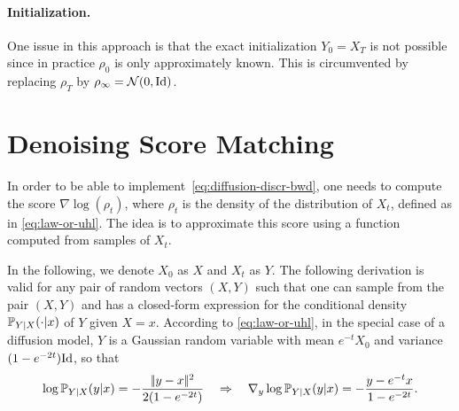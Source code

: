 \paragraph{Initialization.} One issue in this approach is that the exact initialization $Y_0=X_T$ is not possible since in practice $\rho_0$ is only approximately known. This is circumvented by replacing $\rho_T$ by $\rho_\infty = \mathcal{N}(0,\mathrm{Id})$.


\section{Denoising Score Matching}

In order to be able to implement~\eqref{eq:diffusion-discr-bwd}, one needs to compute the score $\nabla \log(\rho_t)$, where $\rho_t$ is the density of the distribution of $X_t$, defined as in \eqref{eq:law-or-uhl}. The idea is to approximate this score using a function computed from samples of $X_t$.

In the following, we denote $X_0$ as $X$ and $X_t$ as $Y$. The following derivation is valid for any pair of random vectors $(X,Y)$ such that one can sample from the pair $(X,Y)$ and has a closed-form expression for the conditional density $\mathbb{P}_{Y|X}(\cdot|x)$ of $Y$ given $X=x$. According to \eqref{eq:law-or-uhl}, in the special case of a diffusion model, $Y$ is a Gaussian random variable with mean $e^{-t} X_0$ and variance $(1-e^{-2t}) \mathrm{Id}$, so that 
\begin{equation}
	\log \mathbb{P}_{Y|X}(y|x) =- \frac{|\!| y-x |\!|^2}{2 (1-e^{-2t})}
	\quad \Rightarrow \quad
	\nabla_y \log \mathbb{P}_{Y|X}(y|x) = - \frac{y-e^{-t} x}{1-e^{-2t}}.
\end{equation}

